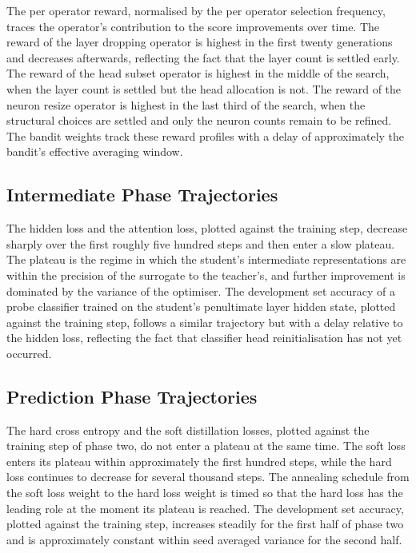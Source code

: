 The per operator reward, normalised by the per operator selection frequency, traces the operator's contribution to the score improvements over time. The reward of the layer dropping operator is highest in the first twenty generations and decreases afterwards, reflecting the fact that the layer count is settled early. The reward of the head subset operator is highest in the middle of the search, when the layer count is settled but the head allocation is not. The reward of the neuron resize operator is highest in the last third of the search, when the structural choices are settled and only the neuron counts remain to be refined. The bandit weights track these reward profiles with a delay of approximately the bandit's effective averaging window.

\subsection{Intermediate Phase Trajectories}

The hidden loss and the attention loss, plotted against the training step, decrease sharply over the first roughly five hundred steps and then enter a slow plateau. The plateau is the regime in which the student's intermediate representations are within the precision of the surrogate to the teacher's, and further improvement is dominated by the variance of the optimiser. The development set accuracy of a probe classifier trained on the student's penultimate layer hidden state, plotted against the training step, follows a similar trajectory but with a delay relative to the hidden loss, reflecting the fact that classifier head reinitialisation has not yet occurred.

\subsection{Prediction Phase Trajectories}

The hard cross entropy and the soft distillation losses, plotted against the training step of phase two, do not enter a plateau at the same time. The soft loss enters its plateau within approximately the first hundred steps, while the hard loss continues to decrease for several thousand steps. The annealing schedule from the soft loss weight to the hard loss weight is timed so that the hard loss has the leading role at the moment its plateau is reached. The development set accuracy, plotted against the training step, increases steadily for the first half of phase two and is approximately constant within seed averaged variance for the second half.

